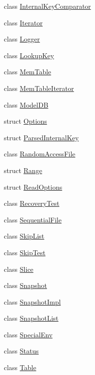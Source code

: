 \begin{DoxyCompactItemize}
\item 
class \mbox{\hyperlink{classleveldb_1_1_internal_key_comparator}{Internal\+Key\+Comparator}}
\item 
class \mbox{\hyperlink{classleveldb_1_1_iterator}{Iterator}}
\item 
class \mbox{\hyperlink{classleveldb_1_1_logger}{Logger}}
\item 
class \mbox{\hyperlink{classleveldb_1_1_lookup_key}{Lookup\+Key}}
\item 
class \mbox{\hyperlink{classleveldb_1_1_mem_table}{Mem\+Table}}
\item 
class \mbox{\hyperlink{classleveldb_1_1_mem_table_iterator}{Mem\+Table\+Iterator}}
\item 
class \mbox{\hyperlink{classleveldb_1_1_model_d_b}{Model\+DB}}
\item 
struct \mbox{\hyperlink{structleveldb_1_1_options}{Options}}
\item 
struct \mbox{\hyperlink{structleveldb_1_1_parsed_internal_key}{Parsed\+Internal\+Key}}
\item 
class \mbox{\hyperlink{classleveldb_1_1_random_access_file}{Random\+Access\+File}}
\item 
struct \mbox{\hyperlink{structleveldb_1_1_range}{Range}}
\item 
struct \mbox{\hyperlink{structleveldb_1_1_read_options}{Read\+Options}}
\item 
class \mbox{\hyperlink{classleveldb_1_1_recovery_test}{Recovery\+Test}}
\item 
class \mbox{\hyperlink{classleveldb_1_1_sequential_file}{Sequential\+File}}
\item 
class \mbox{\hyperlink{classleveldb_1_1_skip_list}{Skip\+List}}
\item 
class \mbox{\hyperlink{classleveldb_1_1_skip_test}{Skip\+Test}}
\item 
class \mbox{\hyperlink{classleveldb_1_1_slice}{Slice}}
\item 
class \mbox{\hyperlink{classleveldb_1_1_snapshot}{Snapshot}}
\item 
class \mbox{\hyperlink{classleveldb_1_1_snapshot_impl}{Snapshot\+Impl}}
\item 
class \mbox{\hyperlink{classleveldb_1_1_snapshot_list}{Snapshot\+List}}
\item 
class \mbox{\hyperlink{classleveldb_1_1_special_env}{Special\+Env}}
\item 
class \mbox{\hyperlink{classleveldb_1_1_status}{Status}}
\item 
class \mbox{\hyperlink{classleveldb_1_1_table}{Table}}

\end{DoxyCompactItemize}

